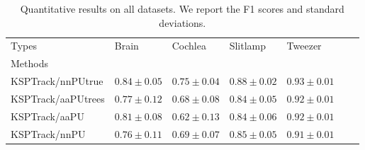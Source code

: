 \begin{table*}[t]
\centering
\caption{
Quantitative results on all datasets. We report the F1 scores and standard deviations.
}
\label{tab:results}
\begin{tabular}{llp{1.8cm}p{1.8cm}p{1.8cm}p{1.8cm}p{1.8cm}}
\toprule
Types &                 Brain &               Cochlea &              Slitlamp &               Tweezer \\
Methods            &                       &                       &                       &                       \\
\midrule
KSPTrack/nnPUtrue      &       $\bm{0.84} \pm 0.05$ &  $\bm{0.75} \pm 0.04$ &  $\bm{0.88} \pm 0.02$ &       $\bm{0.93} \pm 0.01$ \\
KSPTrack/aaPUtrees &       $0.77 \pm 0.12$ &       $0.68 \pm 0.08$ &       $0.84 \pm 0.05$ &       $0.92 \pm 0.01$ \\
KSPTrack/aaPU      &  $0.81 \pm 0.08$ &       $0.62 \pm 0.13$ &       $0.84 \pm 0.06$ &  $0.92 \pm 0.01$ \\
KSPTrack/nnPU      &       $0.76 \pm 0.11$ &  $0.69 \pm 0.07$ &  $0.85 \pm 0.05$ &       $0.91 \pm 0.01$ \\
\bottomrule
\end{tabular}
\end{table*}
